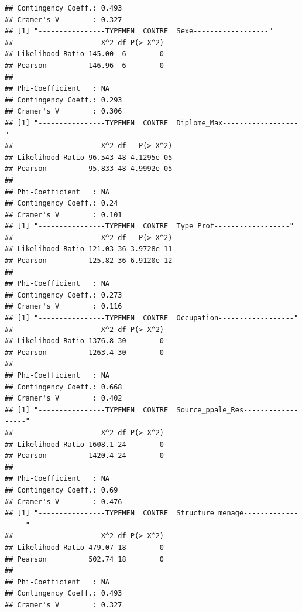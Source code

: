 \documentclass[11pt,a4paper, x11names]{article}\usepackage[]{graphicx}\usepackage[]{color}
\makeatletter
\newenvironment{kframe}{%
 \def\at@end@of@kframe{}%
 \ifinner\ifhmode%
  \def\at@end@of@kframe{\end{minipage}}%
  \begin{minipage}{\columnwidth}%
 \fi\fi%
 \def\FrameCommand##1{\hskip\@totalleftmargin \hskip-\fboxsep
 \colorbox{shadecolor}{##1}\hskip-\fboxsep
     \hskip-\linewidth \hskip-\@totalleftmargin \hskip\columnwidth}%
 \MakeFramed {\advance\hsize-\width
   \@totalleftmargin\z@ \linewidth\hsize
   \@setminipage}}%
 {\par\unskip\endMakeFramed%
 \at@end@of@kframe}
\newenvironment{knitrout}{}{} %
\makeatother
\begin{document}
\begin{knitrout}
\begin{kframe}
\begin{verbatim}
## Contingency Coeff.: 0.493 
## Cramer's V        : 0.327 
## [1] "----------------TYPEMEN  CONTRE  Sexe------------------"
##                     X^2 df P(> X^2)
## Likelihood Ratio 145.00  6        0
## Pearson          146.96  6        0
## 
## Phi-Coefficient   : NA 
## Contingency Coeff.: 0.293 
## Cramer's V        : 0.306 
## [1] "----------------TYPEMEN  CONTRE  Diplome_Max------------------"
##                     X^2 df   P(> X^2)
## Likelihood Ratio 96.543 48 4.1295e-05
## Pearson          95.833 48 4.9992e-05
## 
## Phi-Coefficient   : NA 
## Contingency Coeff.: 0.24 
## Cramer's V        : 0.101 
## [1] "----------------TYPEMEN  CONTRE  Type_Prof------------------"
##                     X^2 df   P(> X^2)
## Likelihood Ratio 121.03 36 3.9728e-11
## Pearson          125.82 36 6.9120e-12
## 
## Phi-Coefficient   : NA 
## Contingency Coeff.: 0.273 
## Cramer's V        : 0.116 
## [1] "----------------TYPEMEN  CONTRE  Occupation------------------"
##                     X^2 df P(> X^2)
## Likelihood Ratio 1376.8 30        0
## Pearson          1263.4 30        0
## 
## Phi-Coefficient   : NA 
## Contingency Coeff.: 0.668 
## Cramer's V        : 0.402 
## [1] "----------------TYPEMEN  CONTRE  Source_ppale_Res------------------"
##                     X^2 df P(> X^2)
## Likelihood Ratio 1608.1 24        0
## Pearson          1420.4 24        0
## 
## Phi-Coefficient   : NA 
## Contingency Coeff.: 0.69 
## Cramer's V        : 0.476 
## [1] "----------------TYPEMEN  CONTRE  Structure_menage------------------"
##                     X^2 df P(> X^2)
## Likelihood Ratio 479.07 18        0
## Pearson          502.74 18        0
## 
## Phi-Coefficient   : NA 
## Contingency Coeff.: 0.493 
## Cramer's V        : 0.327
\end{verbatim}
\end{kframe}
\end{knitrout}
\end{document}
